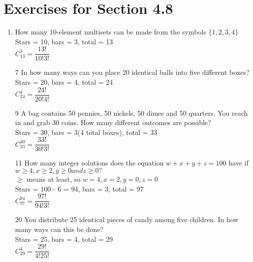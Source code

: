 \documentclass[12pt]{article}
\begin{document}
\section*{Exercises for Section 4.8}
\begin{enumerate}
    \item How many 10-element multisets can be made from the symbols $\{1,2,3,4\}$\\
	Stars = 10, bars = 3, total = 13\\
	\textbf{$C_{13}^3 = \dfrac{13!}{10!3!}$}
    \item [7] In how many ways can you place 20 identical balls into five different boxes?\\
	Stars = 20, bars = 4, total = 24\\
	\textbf{$C_{24}^4 = \dfrac{24!}{20!4!}$}
    \item [9] A bag contains 50 pennies, 50 nickels, 50 dimes and 50 quarters. You reach in and grab 30 coins. How many different outcomes are possible?\\
	Stars = 30, bars = 3(4 total boxes), total = 33\\
	\textbf{$C_{33}^{30} = \dfrac{33!}{30!3!}$}
    \item [11] How many integer solutions does the equation $w+ x + y+ z = 100$ have if $w \ge 4, x \ge 2, y \ge 0 and z \ge 0?$\\
	$\ge$ means at least, so $w=4, x=2, y=0, z=0$\\
	Stars = 100 - 6 = 94, bars = 3, total = 97\\
	\textbf{$C_{97}^{94} = \dfrac{97!}{94!3!}$}
    \item [20] You distribute 25 identical pieces of candy among five children. In how many ways can this be done?\\
	Stars = 25, bars = 4, total = 29\\
	\textbf{}$C_{29}^4 = \dfrac{29!}{4!25!}$
\end{enumerate}
\end{document}
